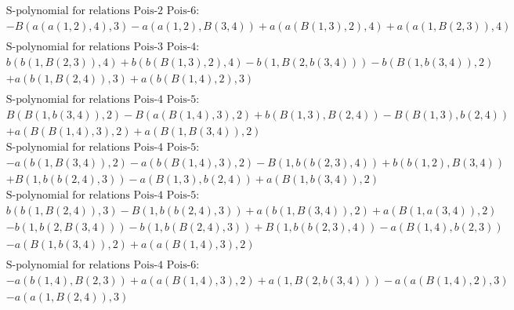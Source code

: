 \documentclass[11pt]{amsart}
\begin{document}
\begin{align*}
& \text{S-polynomial for relations Pois-2 Pois-6:} \\ 
& - B(a(a(1,2),4),3) - a(a(1,2),B(3,4)) + a(a(B(1,3),2),4) + a(a(1,B(2,3)),4) \\ 
\end{align*}\begin{align*} 
& \text{S-polynomial for relations Pois-3 Pois-4:} \\ 
&b(b(1,B(2,3)),4) + b(b(B(1,3),2),4) - b(1,B(2,b(3,4))) - b(B(1,b(3,4)),2)\\ 
 &  + a(b(1,B(2,4)),3) + a(b(B(1,4),2),3) \\ 
\end{align*}\begin{align*} 
& \text{S-polynomial for relations Pois-4 Pois-5:} \\ 
&B(B(1,b(3,4)),2) - B(a(B(1,4),3),2) + b(B(1,3),B(2,4)) - B(B(1,3),b(2,4))\\ 
 &  + a(B(B(1,4),3),2) + a(B(1,B(3,4)),2) \\ 
& \text{S-polynomial for relations Pois-4 Pois-5:} \\ 
& - a(b(1,B(3,4)),2) - a(b(B(1,4),3),2) - B(1,b(b(2,3),4)) + b(b(1,2),B(3,4))\\ 
 &  + B(1,b(b(2,4),3)) - a(B(1,3),b(2,4)) + a(B(1,b(3,4)),2) \\ 
& \text{S-polynomial for relations Pois-4 Pois-5:} \\ 
&b(b(1,B(2,4)),3) - B(1,b(b(2,4),3)) + a(b(1,B(3,4)),2) + a(B(1,a(3,4)),2)\\ 
 &  - b(1,b(2,B(3,4))) - b(1,b(B(2,4),3)) + B(1,b(b(2,3),4)) - a(B(1,4),b(2,3))\\ 
 &  - a(B(1,b(3,4)),2) + a(a(B(1,4),3),2) \\ 
\end{align*}\begin{align*} 
& \text{S-polynomial for relations Pois-4 Pois-6:} \\ 
& - a(b(1,4),B(2,3)) + a(a(B(1,4),3),2) + a(1,B(2,b(3,4))) - a(a(B(1,4),2),3)\\ 
 &  - a(a(1,B(2,4)),3) \\ 
\end{align*}
 
\end{document}
